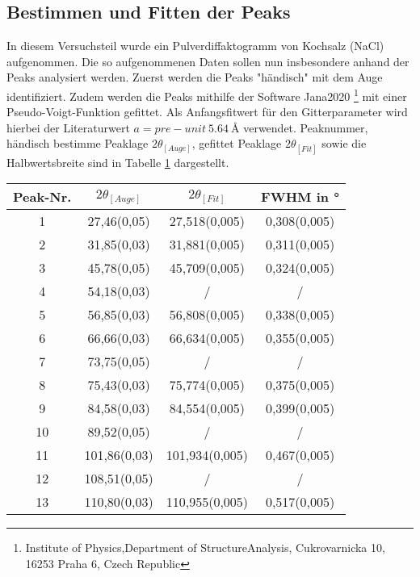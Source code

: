 \subsection{Bestimmen und Fitten der Peaks}
In diesem Versuchsteil wurde ein Pulverdiffaktogramm von Kochsalz (NaCl) aufgenommen. Die so aufgenommenen Daten sollen nun insbesondere anhand der Peaks analysiert werden. Zuerst werden die Peaks "händisch" mit dem Auge identifiziert. Zudem werden die Peaks mithilfe der Software Jana2020 \footnote[number]{Institute of Physics,Department of StructureAnalysis, Cukrovarnicka 10, 16253 Praha 6, Czech Republic} mit einer Pseudo-Voigt-Funktion gefittet. Als Anfangsfitwert für den Gitterparameter wird hierbei der Literaturwert $a = \SI[options]{5,64}[pre-unit]{\angstrom}$ verwendet. Peaknummer, händisch bestimme Peaklage $2\theta_{[Auge]}$, gefittet Peaklage $2\theta_{[Fit]}$ sowie die Halbwertsbreite sind in Tabelle \ref{tab:peaks} dargestellt.


\begin{table}[h]\label{tab:peaks}
    \centering
     \begin{tabular}{|c|c|c|c|} 
     \hline
     Peak-Nr. & $2\theta_{[Auge]}$ & $2\theta_{[Fit]}$ & FWHM in ° \\ [0.5ex] 
     \hline\hline
     1 & \num[options]{27,46(0,05)} & \num[options]{27,518(0,005)} & \num[options]{0,308(0,005)} \\ 
     2 & \num[options]{31,85(0,03)} & \num[options]{31,881(0,005)} & \num[options]{0,311(0,005)} \\
     3 & \num[options]{45,78(0,05)} & \num[options]{45,709(0,005)} & \num[options]{0,324(0,005)} \\
     4 & \num[options]{54,18(0,03)} & / & / \\
     5 & \num[options]{56,85(0,03)} & \num[options]{56,808(0,005)} & \num[options]{0,338(0,005)} \\ 
     6 & \num[options]{66,66(0,03)} & \num[options]{66,634(0,005)} & \num[options]{0,355(0,005)} \\
     7 & \num[options]{73,75(0,05)} & / & / \\
     8 & \num[options]{75,43(0,03)} & \num[options]{75,774(0,005)} & \num[options]{0,375(0,005)} \\
     9 & \num[options]{84,58(0,03)} & \num[options]{84,554(0,005)} & \num[options]{0,399(0,005)} \\
     10 & \num[options]{89,52(0,05)} & / & / \\
     11 & \num[options]{101,86(0,03)} & \num[options]{101,934(0,005)} & \num[options]{0,467(0,005)} \\
     12 & \num[options]{108,51(0,05)} & / & / \\
     13 & \num[options]{110,80(0,03)} & \num[options]{110,955(0,005)} & \num[options]{0,517(0,005)} \\  [1ex] 
     \hline
     \end{tabular}
\end{table}

